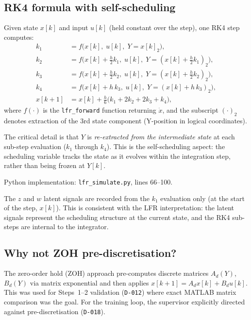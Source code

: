 \documentclass[11pt,a4paper]{article}
\newcommand{\xdot}{\dot{x}}
\newcommand{\decref}[1]{\texttt{D-#1}}
\newcommand{\pyfile}[1]{\texttt{#1}}
\begin{document}
\subsection{RK4 formula with self-scheduling}

Given state $x[k]$ and input $u[k]$ (held constant over the step), one RK4 step computes:
\begin{align}
k_1 &= f\bigl(x[k],\; u[k],\; Y = x[k]_2\bigr), \label{eq:rk4_k1} \\
k_2 &= f\bigl(x[k] + \tfrac{h}{2} k_1,\; u[k],\; Y = (x[k] + \tfrac{h}{2} k_1)_2\bigr), \label{eq:rk4_k2} \\
k_3 &= f\bigl(x[k] + \tfrac{h}{2} k_2,\; u[k],\; Y = (x[k] + \tfrac{h}{2} k_2)_2\bigr), \label{eq:rk4_k3} \\
k_4 &= f\bigl(x[k] + h\, k_3,\; u[k],\; Y = (x[k] + h\, k_3)_2\bigr), \label{eq:rk4_k4} \\
x[k\!+\!1] &= x[k] + \frac{h}{6}\bigl(k_1 + 2 k_2 + 2 k_3 + k_4\bigr), \label{eq:rk4_update}
\end{align}
where $f(\cdot)$ is the \texttt{lfr\_forward} function returning $\xdot$, and the subscript
$(\cdot)_2$ denotes extraction of the 3rd state component (Y-position in logical coordinates).

The critical detail is that $Y$ is \emph{re-extracted from the intermediate state} at each
sub-step evaluation ($k_1$ through $k_4$). This is the self-scheduling aspect: the scheduling
variable tracks the state as it evolves within the integration step, rather than being frozen
at $Y[k]$.

Python implementation: \pyfile{lfr\_simulate.py}, lines 66--100.

The $z$ and $w$ latent signals are recorded from the $k_1$ evaluation only (at the start of
the step, $x[k]$). This is consistent with the LFR interpretation: the latent signals
represent the scheduling structure at the current state, and the RK4 sub-steps are internal
to the integrator.

\subsection{Why not ZOH pre-discretisation?}

The zero-order hold (ZOH) approach pre-computes discrete matrices $A_d(Y)$, $B_d(Y)$ via
matrix exponential and then applies $x[k+1] = A_d x[k] + B_d u[k]$. This was used for
Steps~1--2 validation (\decref{012}) where exact MATLAB matrix comparison was the goal. For
the training loop, the supervisor explicitly directed against pre-discretisation (\decref{018}).
\end{document}
